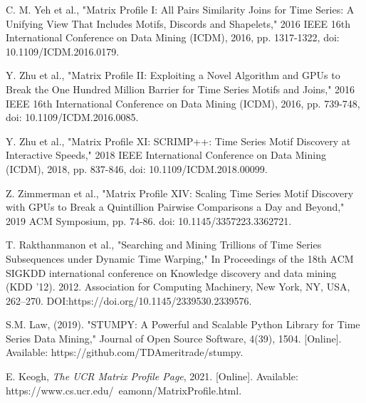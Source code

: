 \documentclass[conference]{IEEEtran}
\begin{document}


\begin{thebibliography}{7}  

 C. M. Yeh et al., "Matrix Profile I: All Pairs Similarity Joins for Time Series: A Unifying View That Includes Motifs, Discords and Shapelets," 2016 IEEE 16th International Conference on Data Mining (ICDM), 2016, pp. 1317-1322, doi: 10.1109/ICDM.2016.0179.

 Y. Zhu et al., "Matrix Profile II: Exploiting a Novel Algorithm and GPUs to Break the One Hundred Million Barrier for Time Series Motifs and Joins," 2016 IEEE 16th International Conference on Data Mining (ICDM), 2016, pp. 739-748, doi: 10.1109/ICDM.2016.0085.

 Y. Zhu et al., "Matrix Profile XI: SCRIMP++: Time Series Motif Discovery at Interactive Speeds," 2018 IEEE International Conference on Data Mining (ICDM), 2018, pp. 837-846, doi: 10.1109/ICDM.2018.00099.

 Z. Zimmerman et al., "Matrix Profile XIV: Scaling Time Series Motif Discovery with GPUs to Break a Quintillion Pairwise Comparisons a Day and Beyond," 2019 ACM Symposium, pp. 74-86. doi: 10.1145/3357223.3362721. 

 T. Rakthanmanon et al., "Searching and Mining Trillions of Time Series Subsequences under Dynamic Time Warping," In Proceedings of the 18th ACM SIGKDD international conference on Knowledge discovery and data mining (KDD '12). 2012. Association for Computing Machinery, New York, NY, USA, 262–270. DOI:https://doi.org/10.1145/2339530.2339576.

 S.M. Law, (2019). "STUMPY: A Powerful and Scalable Python Library for Time Series Data Mining," Journal of Open Source Software, 4(39), 1504. [Online]. Available: https://github.com/TDAmeritrade/stumpy.

 E. Keogh, \emph{The UCR Matrix Profile Page}, 2021. [Online]. Available: https://www.cs.ucr.edu/~eamonn/MatrixProfile.html.


\end{thebibliography}
\end{document}

